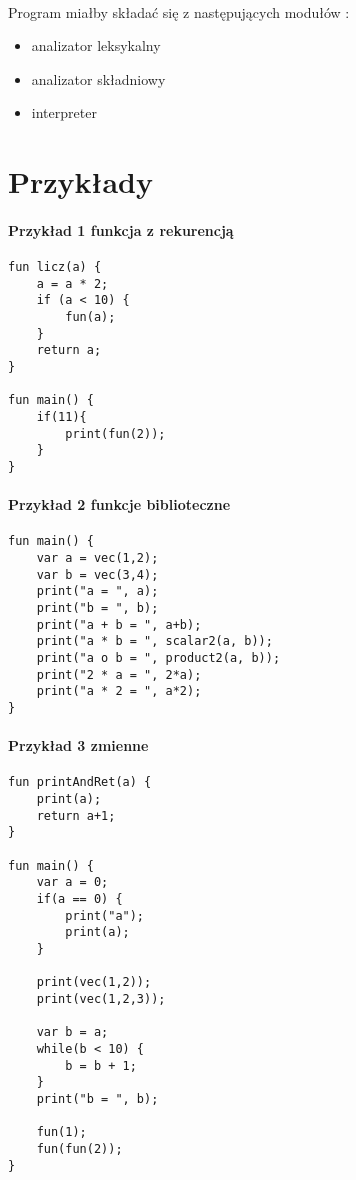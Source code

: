 \documentclass[11pt]{article} %
\begin{document}
\paragraph{}
Program miałby składać się z następujących modułów : 
\begin{itemize}
	\item analizator leksykalny
	\item analizator składniowy
	\item interpreter
\end{itemize}

\section{Przykłady}

\paragraph{Przykład 1 funkcja z rekurencją}
\begin{verbatim}
fun licz(a) {
    a = a * 2;   
    if (a < 10) {      
        fun(a);   
    }    		 
    return a;  	
}  				
	
fun main() {
    if(11){
        print(fun(2));
    }
}					
\end{verbatim}

\paragraph{Przykład 2 funkcje biblioteczne}
\begin{verbatim}
fun main() {
    var a = vec(1,2);
    var b = vec(3,4);
    print("a = ", a);
    print("b = ", b);
    print("a + b = ", a+b);
    print("a * b = ", scalar2(a, b));
    print("a o b = ", product2(a, b));
    print("2 * a = ", 2*a);    	
    print("a * 2 = ", a*2);
}   
\end{verbatim}

\paragraph{Przykład 3 zmienne}
\begin{verbatim}
fun printAndRet(a) {
    print(a);
    return a+1;
}

fun main() {
    var a = 0;
    if(a == 0) {
        print("a");
        print(a);
    }

    print(vec(1,2));
    print(vec(1,2,3));

    var b = a;
    while(b < 10) {
        b = b + 1;
    }
    print("b = ", b);

    fun(1);
    fun(fun(2));
}   
\end{verbatim}
\end{document}
